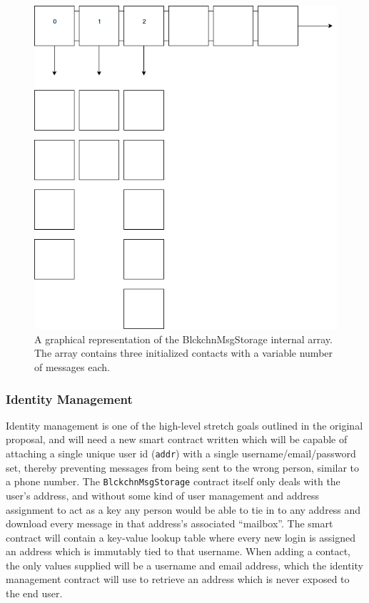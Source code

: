 \documentclass[titlepage]{report}
\begin{document}
\begin{figure}[tph!]
    \centering
    \includegraphics[width=0.7\linewidth]{message_storage}
    \caption{A graphical representation of the BlckchnMsgStorage internal array. The array contains three initialized contacts with a variable number of messages each.}
    \label{fig:messagestorage}
\end{figure}

\subsubsection{Identity Management}
\gls{Identity management} is one of the high-level stretch goals outlined in the original proposal, and will need a new \gls{smart contract} written which will be capable of attaching a single unique user id (\texttt{addr}) with a single username/email/password set, thereby preventing messages from being sent to the wrong person, similar to a phone number. The \texttt{BlckchnMsgStorage} contract itself only deals with the user's address, and without some kind of user management and address assignment to act as a key any person would be able to tie in to any address and download every message in that address's associated ``mailbox''. The smart contract will contain a key-value lookup table where every new login is assigned an address which is immutably tied to that username. When adding a contact, the only values supplied will be a username and email address, which the identity management contract will use to retrieve an address which is never exposed to the end user.
\end{document}
